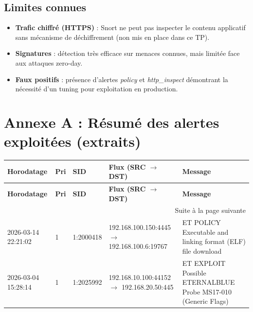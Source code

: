 \documentclass[12pt,a4paper,openany]{report}
\newcommand{\tableheadcolor}{\rowcolor{tableheadbg}}
\begin{document}
\subsection{Limites connues}

\begin{itemize}
\item \textbf{Trafic chiffré (HTTPS)} : Snort ne peut pas inspecter le contenu applicatif sans mécanisme de déchiffrement (non mis en place dans ce TP).
\item \textbf{Signatures} : détection très efficace sur menaces connues, mais limitée face aux attaques zero-day.
\item \textbf{Faux positifs} : présence d'alertes \textit{policy} et \textit{http\_inspect} démontrant la nécessité d'un tuning pour exploitation en production.
\end{itemize}

\section{Annexe A : Résumé des alertes exploitées (extraits)}

\begin{longtable}{p{2.8cm} p{1.2cm} p{2.3cm} p{4.1cm} p{4.1cm}}
\arrayrulecolor{tableborder}
\hline
\tableheadcolor
\textcolor{tableheadfg}{\textbf{Horodatage}} &
\textcolor{tableheadfg}{\textbf{Pri}} &
\textcolor{tableheadfg}{\textbf{SID}} &
\textcolor{tableheadfg}{\textbf{Flux (SRC $\rightarrow$ DST)}} &
\textcolor{tableheadfg}{\textbf{Message}} \\
\hline
\endfirsthead

\hline
\tableheadcolor
\textcolor{tableheadfg}{\textbf{Horodatage}} &
\textcolor{tableheadfg}{\textbf{Pri}} &
\textcolor{tableheadfg}{\textbf{SID}} &
\textcolor{tableheadfg}{\textbf{Flux (SRC $\rightarrow$ DST)}} &
\textcolor{tableheadfg}{\textbf{Message}} \\
\hline
\endhead

\hline
\multicolumn{5}{r}{\small\textcolor{footergray}{Suite à la page suivante}}\\
\endfoot

\hline
\endlastfoot

\rowcolor{tablerowalt}
2026-03-14 22:21:02 & 1 & 1:2000418 &
192.168.100.150:4445 $\rightarrow$ 192.168.100.6:19767 &
ET POLICY Executable and linking format (ELF) file download \\

2026-03-04 15:28:14 & 1 & 1:2025992 &
192.168.10.100:44152 $\rightarrow$ 192.168.20.50:445 &
ET EXPLOIT Possible ETERNALBLUE Probe MS17-010 (Generic Flags) \\
\end{longtable}
\end{document}
